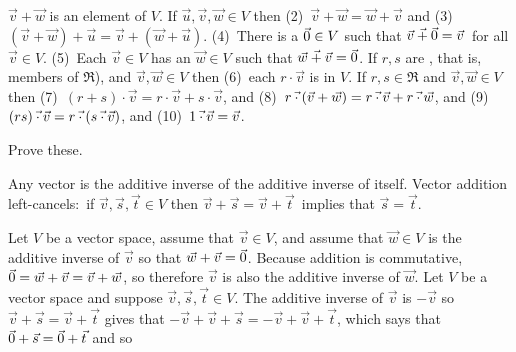 \begin{exercises}
\begin{answer}
{          \( \vec{v}\plus\vec{w} \) is an element of \( V \).
        If \( \vec{u},\vec{v},\vec{w}\in V \) then 
        (2)~\( \vec{v}\plus\vec{w}=\vec{w}\plus\vec{v} \) and 
        (3)~\( (\vec{v}\plus\vec{w})\plus\vec{u}
                 =\vec{v}\plus(\vec{w}\plus\vec{u}) \).
        (4)~There is a 
          \( \vec{0}\in V \) such that
          \( \vec{v}\mathbin{\vec{+}}\vec{0}=\vec{v}\, \) for all \( \vec{v}\in V\).
        (5)~Each \( \vec{v}\in V \) has an
          \( \vec{w}\in V \) such that \( \vec{w}\mathbin{\vec{+}}\vec{v}=\vec{0} \).
        If \( r,s \) are ,
        that is, members of \( \Re \)),
        and \( \vec{v},\vec{w}\in V \) then 
        (6)~each
           \( r\cdot\vec{v} \) is in \( V \).
        If \( r,s\in\Re \) and \( \vec{v},\vec{w}\in V \) then
        (7)~\( (r+ s)\cdot\vec{v}=r\cdot\vec{v}\plus s\cdot\vec{v} \), 
        and (8)~\( r\mathbin{\vec{\cdot}} (\vec{v}+\vec{w})
           =r\mathbin{\vec{\cdot}}\vec{v}+r\mathbin{\vec{\cdot}}\vec{w} \),
        and (9)~\( (rs)\mathbin{\vec{\cdot}} \vec{v} =r\mathbin{\vec{\cdot}} (s\mathbin{\vec{\cdot}}\vec{v}) \),
        and (10)~\( 1\mathbin{\vec{\cdot}} \vec{v}=\vec{v} \).
     }
    \end{answer}
  \recommended \item 
    Prove these.
    \begin{exparts}
      \partsitem Any vector is the additive inverse of the additive inverse of
        itself.
      \partsitem Vector addition left-cancels:~if 
        \( \vec{v},\vec{s},\vec{t}\in V \)
        then \( \vec{v}+\vec{s}=\vec{v}+\vec{t}\, \) implies
        that \( \vec{s}=\vec{t} \).
    \end{exparts}
    \begin{answer}
      \begin{exparts}
        \partsitem Let \( V \) be a vector space, 
          assume that \( \vec{v}\in V \), and
          assume that \( \vec{w}\in V \) is the additive inverse of $\vec{v}$
          so that \( \vec{w}+\vec{v}=\vec{0} \).
          Because addition is commutative,
          \( \vec{0}=\vec{w}+\vec{v}=\vec{v}+\vec{w} \),
          so therefore \( \vec{v} \) is also 
          the additive inverse of \( \vec{w} \).
        \partsitem Let \( V \) be a vector space and suppose
          \( \vec{v},\vec{s},\vec{t}\in V \).
          The additive inverse of \( \vec{v} \) is \( -\vec{v} \) so
          \( \vec{v}+\vec{s}=\vec{v}+\vec{t} \) gives that
          \( -\vec{v}+\vec{v}+\vec{s}=-\vec{v}+\vec{v}+\vec{t} \),
          which says that \( \vec{0}+\vec{s}=\vec{0}+\vec{t} \) and so

\end{exparts}
\end{answer}
\end{exercises}
